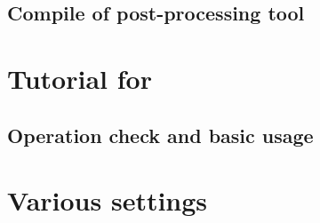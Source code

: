 \documentclass[a4paper]{report}
\begin{document}
 \chapter{Compile of post-processing tool}
 


\part{Tutorial for \scaledg}
 \chapter{Operation check and basic usage} \label{chap:tutorial_ideal}
 
 
 
 


%  
%  
%  
%  
%  
%  
%  


% 
% 
% 


\part{Various settings} \label{part:basic_usel}
\end{document}

